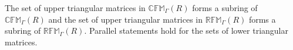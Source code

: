 The set of upper triangular matrices in $\mathbb{CFM}_{\Gamma}(R)$ forms a subring of $\mathbb{CFM}_{\Gamma}(R)$ and the set of upper triangular matrices in $\mathbb{RFM}_{\Gamma}(R)$ forms a subring of $\mathbb{RFM}_{\Gamma}(R)$. Parallel statements hold for the sets of lower triangular matrices.
